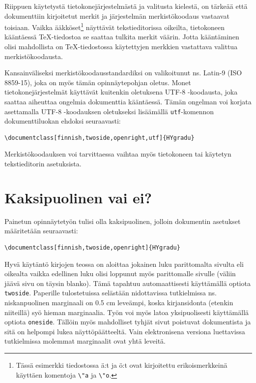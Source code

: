 \documentclass[finnish,twoside,openright]{HYgradu}
\begin{document}
Riippuen k\"aytetyst\"a tietokonej\"arjestelm\"ast\"a ja valitusta kielest\"a, on t\"arke\"a\"a ett\"a dokumenttiin kirjoitetut merkit ja j\"arjestelm\"an merkist\"okoodaus vastaavat toisiaan. Vaikka \"a\"akk\"oset\footnote{T\"ass\"a esimerkki tiedostossa \"a:t ja \"o:t ovat kirjoitettu erikoismerkkein\"a k\"aytt\"aen komentoja \texttt{\textbackslash"a} ja \texttt{\textbackslash"o}.} n\"aytt\"av\"at tekstieditorissa oikeilta, tietokoneen k\"a\"ant\"aess\"a \TeX-tiedostoa se saattaa tulkita merkit v\"a\"arin. Jotta k\"a\"ant\"aminen olisi mahdollista on \TeX-tiedostossa k\"aytettyjen merkkien vastattava valittua merkist\"okoodausta. 

Kansainv\"aliseksi merkist\"okoodausstandardiksi on valikoitunut ns. Latin-9 (ISO 8859-15), joka on my\"os t\"am\"an opinn\"aytepohjan oletus. Monet tietokonej\"arjestelm\"at k\"aytt\"av\"at kuitenkin oletuksena UTF-8 -koodausta, joka saattaa aiheuttaa ongelmia dokumenttia k\"a\"ant\"aess\"a. T\"am\"an ongelman voi korjata asettamalla UTF-8 -koodauksen oletukseksi lis\"a\"am\"all\"a \texttt{utf}-komennon dokumenttiluokan ehdoksi seuraavasti:
\begin{verbatim}
\documentclass[finnish,twoside,openright,utf]{HYgradu}
\end{verbatim}
Merkist\"okoodauksen voi tarvittaessa vaihtaa my\"os tietokoneen tai k\"aytetyn tekstieditorin asetuksista.
 
\section{Kaksipuolinen vai ei?}

Painetun opinn\"aytety\"on tulisi olla kaksipuolinen, jolloin dokumentin asetukset m\"a\"aritet\"a\"an seuraavasti:
\begin{verbatim}
\documentclass[finnish,twoside,openright]{HYgradu}
\end{verbatim}
Hyv\"a k\"ayt\"ant\"o kirjojen teossa on aloittaa jokainen luku parittomalta sivulta eli oikealta vaikka edellinen luku olisi loppunut my\"os parittomalle sivulle (v\"aliin j\"a\"av\"a sivu on t\"aysin blanko). T\"am\"a tapahtuu automaattisesti k\"aytt\"am\"all\"a optiota \texttt{twoside}. Paperille tulostetuissa sel\"ast\"a\"an nidottavissa  tutkielmissa ns. niskanpuolinen marginaali on 0.5 cm leve\"ampi, koska kirjansidonta (etenkin niiteill\"a) sy\"o hieman marginaalia. 
Ty\"on voi my\"os latoa yksipuolisesti k\"aytt\"am\"all\"a optiota \texttt{oneside}. T\"all\"oin my\"os mahdolliset tyhj\"at sivut poistuvat dokumentista ja sit\"a on helpompi lukea n\"aytt\"op\"a\"atteelt\"a. Vain elektronisena versiona luettavissa tutkielmissa molemmat marginaalit ovat yht\"a leveit\"a.
\end{document}
